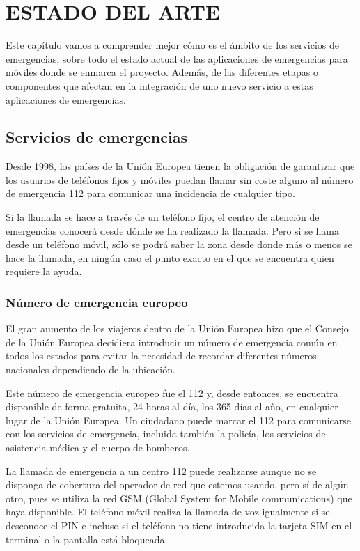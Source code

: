 \chapter{ESTADO DEL ARTE\label{sec:estado_del_arte}}

Este capítulo vamos a comprender mejor cómo es el ámbito de los servicios de emergencias, sobre todo el estado actual de las aplicaciones de emergencias para móviles donde se enmarca el proyecto. Además, de las diferentes etapas o componentes que afectan en la integración de uno nuevo servicio a estas aplicaciones de emergencias.

\clearpage

\section{Servicios de emergencias}

Desde 1998, los países de la Unión Europea tienen la obligación de garantizar que los usuarios de teléfonos fijos y móviles puedan llamar sin coste alguno al número de emergencia 112 para comunicar una incidencia de cualquier tipo.

Si la llamada se hace a través de un teléfono fijo, el centro de atención de emergencias conocerá desde dónde se ha realizado la llamada. Pero si se llama desde un teléfono móvil, sólo se podrá saber la zona desde donde más o menos se hace la llamada, en ningún caso el punto exacto en el que se encuentra quien requiere la ayuda.

\subsection{Número de emergencia europeo}

El gran aumento de los viajeros dentro de la Unión Europea hizo que el Consejo de la Unión Europea decidiera introducir un número de emergencia común en todos los estados para evitar la necesidad de recordar diferentes números nacionales dependiendo de la ubicación.

Este número de emergencia europeo fue el 112 y, desde entonces, se encuentra disponible de forma gratuita, 24 horas al día, los 365 días al año, en cualquier lugar de la Unión Europea. Un ciudadano puede marcar el 112 para comunicarse con los servicios de emergencia, incluida también la policía, los servicios de asistencia médica y el cuerpo de bomberos.

La llamada de emergencia a un centro 112 puede realizarse aunque no se disponga de cobertura del operador de red que estemos usando, pero sí de algún otro, pues se utiliza la red GSM (Global System for Mobile communications) que haya disponible. El teléfono móvil realiza la llamada de voz igualmente si se desconoce el PIN e incluso si el teléfono no tiene introducida la tarjeta SIM en el terminal o la pantalla está bloqueada.

